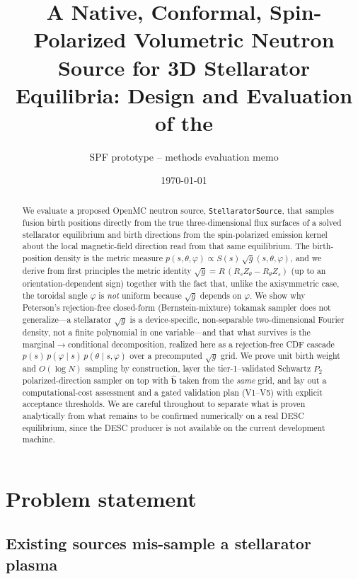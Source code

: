\documentclass[11pt]{article}
\title{\bfseries A Native, Conformal, Spin-Polarized Volumetric Neutron Source
for 3D Stellarator Equilibria: Design and Evaluation of the
\code{StellaratorSource}}
\author{SPF prototype -- methods evaluation memo}
\date{\today}
\newcommand{\sg}{\sqrt{g}}
\newcommand{\Rs}{R_{s}}
\newcommand{\Rt}{R_{\theta}}
\newcommand{\Zs}{Z_{s}}
\newcommand{\Zt}{Z_{\theta}}
\newcommand{\bhat}{\hat{\mathbf{b}}}
\newcommand{\code}[1]{\texttt{#1}}
\begin{document}
\maketitle

\begin{abstract}
\noindent
We evaluate a proposed OpenMC neutron source, \code{StellaratorSource}, that samples
fusion birth positions directly from the true three-dimensional flux surfaces of a
solved stellarator equilibrium and birth directions from the spin-polarized
emission kernel about the local magnetic-field direction read from that same
equilibrium. The birth-position density is the metric measure
$p(s,\theta,\varphi)\propto S(s)\,\sg(s,\theta,\varphi)$, and we derive from first
principles the metric identity $\sg=R\,(\Rs\Zt-\Rt\Zs)$ (up to an
orientation-dependent sign) together with the fact that, unlike the axisymmetric
case, the toroidal angle $\varphi$ is \emph{not} uniform because $\sg$ depends on
$\varphi$. We show why Peterson's rejection-free closed-form (Bernstein-mixture)
tokamak sampler does not generalize---a stellarator $\sg$ is a device-specific,
non-separable two-dimensional Fourier density, not a finite polynomial in one
variable---and that what survives is the marginal$\to$conditional decomposition,
realized here as a rejection-free CDF cascade
$p(s)\,p(\varphi\mid s)\,p(\theta\mid s,\varphi)$ over a precomputed $\sg$ grid. We
prove unit birth weight and $O(\log N)$ sampling by construction, layer the
tier-1--validated Schwartz $P_2$ polarized-direction sampler on top with $\bhat$
taken from the \emph{same} grid, and lay out a computational-cost assessment and a
gated validation plan (V1--V5) with explicit acceptance thresholds. We are careful
throughout to separate what is proven analytically from what remains to be
confirmed numerically on a real DESC equilibrium, since the DESC producer is not
available on the current development machine.
\end{abstract}

\tableofcontents

\section{Problem statement}
\label{sec:problem}

\subsection{Existing sources mis-sample a stellarator plasma}
\end{document}

